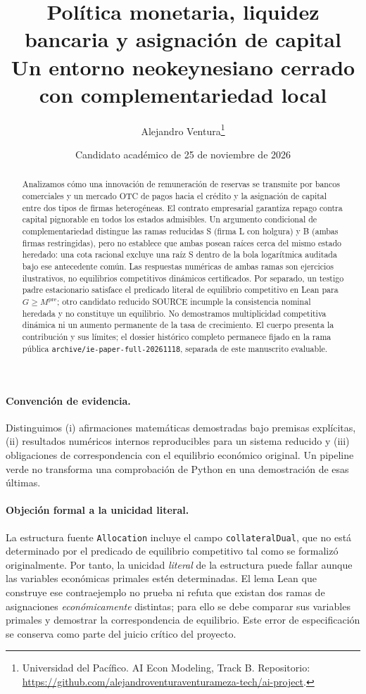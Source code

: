 \documentclass[11pt,a4paper]{article}
\title{Política monetaria, liquidez bancaria y asignación de capital\\
\large Un entorno neokeynesiano cerrado con complementariedad local}
\author{Alejandro Ventura\thanks{Universidad del Pacífico. AI Econ Modeling, Track B.
Repositorio: \url{https://github.com/alejandroventuraventurameza-tech/ai-project}.}}
\date{Candidato académico de 25 de noviembre de 2026}
\numberwithin{equation}{section}
\theoremstyle{definition}
\begin{document}
\maketitle
\begin{abstract}
Analizamos cómo una innovación de remuneración de reservas se transmite
por bancos comerciales y un mercado OTC de pagos hacia el crédito
y la asignación de capital entre dos tipos de firmas heterogéneas.
El contrato empresarial garantiza repago contra capital pignorable en
todos los estados admisibles. Un argumento condicional de complementariedad
distingue las ramas reducidas S (firma L con holgura) y B (ambas firmas
restringidas), pero no establece que ambas posean raíces cerca del
mismo estado heredado: una cota racional excluye una raíz S dentro de
la bola logarítmica auditada bajo ese antecedente común. Las respuestas
numéricas de ambas ramas son ejercicios ilustrativos, no equilibrios
competitivos dinámicos certificados. Por separado, un testigo padre
estacionario satisface el predicado literal de equilibrio competitivo
en Lean para $G\geq M^{\mathrm{pre}}$; otro candidato reducido SOURCE
incumple la consistencia nominal heredada y no constituye un equilibrio.
No demostramos multiplicidad competitiva dinámica ni un aumento
permanente de la tasa de crecimiento.
El cuerpo presenta la contribución y sus límites; el dossier
histórico completo permanece fijado en la rama pública
\texttt{archive/ie-paper-full-20261118}, separada de este
manuscrito evaluable.
\end{abstract}

\paragraph{Convención de evidencia.}
Distinguimos (i) afirmaciones matemáticas demostradas bajo premisas
explícitas, (ii) resultados numéricos internos reproducibles para
un sistema reducido y (iii) obligaciones de correspondencia con el
equilibrio económico original. Un pipeline verde no transforma
una comprobación de Python en una demostración de esas últimas.



\paragraph{Objeción formal a la unicidad literal.}
La estructura fuente \texttt{Allocation} incluye el campo
\texttt{collateralDual}, que no está determinado por el predicado
de equilibrio competitivo tal como se formalizó originalmente.
Por tanto, la unicidad \emph{literal} de la estructura puede fallar
aunque las variables económicas primales estén determinadas.
El lema Lean que construye ese contraejemplo no prueba ni refuta
que existan dos ramas de asignaciones \emph{económicamente}
distintas; para ello se debe comparar sus variables primales
y demostrar la correspondencia de equilibrio. Este error de
especificación se conserva como parte del juicio crítico del proyecto.
\end{document}

